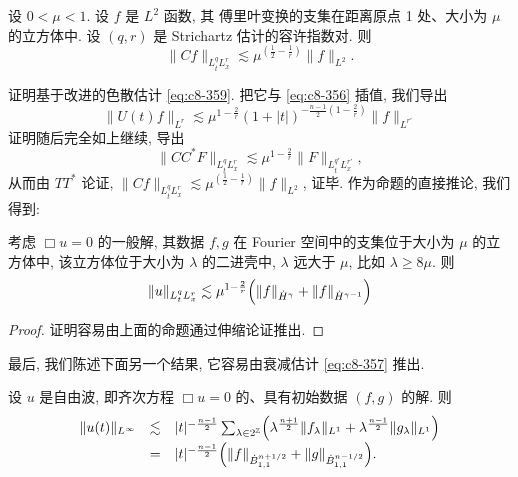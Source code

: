 \begin{proposition}\label{prop:c8-0.41}
设 $0<\mu<1$. 设 $f$ 是 $L^2$ 函数, 其 傅里叶变换的支集在距离原点 1 处、大小为 $\mu$ 的立方体中. 设 $(q, r)$ 是 Strichartz 估计的容许指数对. 则
\begin{equation}
\|Cf\|_{L_t^q L_x^r}\lesssim\mu^{\left(\frac{1}{2}-\frac{1}{r}\right)}\|f\|_{L^2}.\label{eq:c8-362}
\end{equation}
\end{proposition}

证明基于改进的色散估计 \eqref{eq:c8-359}. 把它与 \eqref{eq:c8-356} 插值, 我们导出
\[
\|U(t)f\|_{L^r}\lesssim\mu^{1-\frac{2}{r}}(1+|t|)^{-\frac{n-1}{2}\left(1-\frac{2}{r}\right)}\|f\|_{L^{r'}}
\]
证明随后完全如上继续, 导出
\[
\|CC^{*}F\|_{L_t^q L_x^r}\lesssim\mu^{1-\frac{2}{r}}\|F\|_{L_t^{q'} L_x^{r'}}, 
\]
从而由 $TT^{*}$ 论证, $\|Cf\|_{L_t^q L_x^r}\lesssim\mu^{\left(\frac{1}{2}-\frac{1}{r}\right)}\|f\|_{L^2}$, 证毕. 作为命题的直接推论, 我们得到:

\begin{theorem}\label{thm:c8-0.42}
考虑 $\Box u=0$ 的一般解, 其数据 $f, g$ 在 Fourier 空间中的支集位于大小为 $\mu$ 的立方体中, 该立方体位于大小为 $\lambda$ 的二进壳中, $\lambda$ 远大于 $\mu$, 比如 $\lambda\geq8\mu$. 则
\begin{equation}
\|u\|_{L_t^q L_x^r}\lesssim\mu^{1-\frac{2}{r}}\Bigl(\|f\|_{\dot{H}^\gamma}+\|f\|_{\dot{H}^{\gamma-1}}\Bigr)\label{eq:c8-363}
\end{equation}
\end{theorem}

\begin{proof}
证明容易由上面的命题通过伸缩论证推出. 
\end{proof}

最后, 我们陈述下面另一个结果, 它容易由衰减估计 \eqref{eq:c8-357} 推出. 

\begin{theorem}\label{thm:c8-0.43}
设 $u$ 是自由波, 即齐次方程 $\Box u=0$ 的、具有初始数据 $(f, g)$ 的解. 则
\[
\begin{array}{rcl}
\|u(t)\|_{L^\infty} & \lesssim & |t|^{-\frac{n-1}{2}}\sum_{\lambda\in2^{\mathbb{Z}}}\Bigl(\lambda^{\frac{n+1}{2}}\|f_{\lambda}\|_{L^1}+\lambda^{\frac{n-1}{2}}\|g_{\lambda}\|_{L^1}\Bigr)\\[4pt]
& = & |t|^{-\frac{n-1}{2}}\Bigl(\|f\|_{\dot{B}_{1, 1}^{n+1/2}}+\|g\|_{\dot{B}_{1, 1}^{n-1/2}}\Bigr).
\end{array}
\]
\end{theorem}

